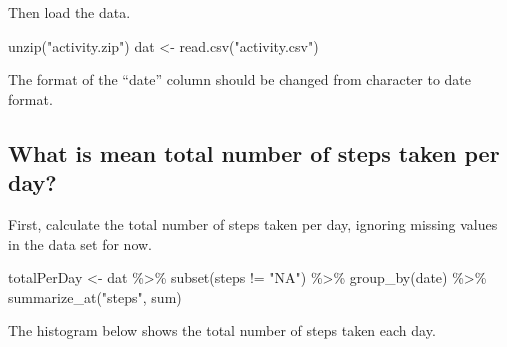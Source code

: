 \documentclass[
]{article}
\newenvironment{Shaded}{\begin{snugshade}}{\end{snugshade}}
\newcommand{\AttributeTok}[1]{\textcolor[rgb]{0.77,0.63,0.00}{#1}}
\newcommand{\DecValTok}[1]{\textcolor[rgb]{0.00,0.00,0.81}{#1}}
\newcommand{\FunctionTok}[1]{\textcolor[rgb]{0.00,0.00,0.00}{#1}}
\newcommand{\NormalTok}[1]{#1}
\newcommand{\OtherTok}[1]{\textcolor[rgb]{0.56,0.35,0.01}{#1}}
\newcommand{\SpecialCharTok}[1]{\textcolor[rgb]{0.00,0.00,0.00}{#1}}
\newcommand{\StringTok}[1]{\textcolor[rgb]{0.31,0.60,0.02}{#1}}
\begin{document}
Then load the data.

\begin{Shaded}
\begin{Highlighting}[]
\FunctionTok{unzip}\NormalTok{(}\StringTok{"activity.zip"}\NormalTok{)}
\NormalTok{dat }\OtherTok{\textless{}{-}} \FunctionTok{read.csv}\NormalTok{(}\StringTok{"activity.csv"}\NormalTok{)}
\end{Highlighting}
\end{Shaded}

The format of the ``date'' column should be changed from character to
date format.

\begin{Shaded}
\end{Shaded}

\hypertarget{what-is-mean-total-number-of-steps-taken-per-day}{%
\subsection{What is mean total number of steps taken per
day?}\label{what-is-mean-total-number-of-steps-taken-per-day}}

First, calculate the total number of steps taken per day, ignoring
missing values in the data set for now.

\begin{Shaded}
\begin{Highlighting}[]
\NormalTok{totalPerDay }\OtherTok{\textless{}{-}}\NormalTok{ dat }\SpecialCharTok{\%\textgreater{}\%}
                \FunctionTok{subset}\NormalTok{(steps }\SpecialCharTok{!=} \StringTok{"NA"}\NormalTok{) }\SpecialCharTok{\%\textgreater{}\%}
                \FunctionTok{group\_by}\NormalTok{(date) }\SpecialCharTok{\%\textgreater{}\%}
                \FunctionTok{summarize\_at}\NormalTok{(}\StringTok{"steps"}\NormalTok{, sum)}
\end{Highlighting}
\end{Shaded}

The histogram below shows the total number of steps taken each day.

\begin{Shaded}
\end{Shaded}
\end{document}
